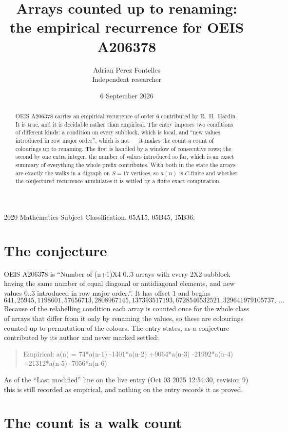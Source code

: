 \documentclass[11pt,a4paper]{article}
\title{Arrays counted up to renaming: the empirical recurrence for OEIS A206378}
\author{Adrian Perez Fontelles\\ \small Independent researcher}
\date{6 September 2026}
\theoremstyle{plain}
\theoremstyle{definition}
\begin{document}
\maketitle

\begin{abstract}
OEIS A206378 carries an empirical recurrence of order $6$ contributed by R.~H.~Hardin. It is
true, and it is decidable rather than empirical. The entry imposes two conditions of different
kinds: a condition on every subblock, which is local, and ``new values introduced in row major
order'', which is not --- it makes the count a count of colourings up to renaming. The first is
handled by a window of consecutive rows; the second by one extra integer, the number of values
introduced so far, which is an exact summary of everything the whole prefix contributes. With
both in the state the arrays are exactly the walks in a digraph on $S=17$ vertices, so $a(n)$
is $C$-finite and whether the conjectured recurrence annihilates it is settled by a finite
exact computation.
\end{abstract}

\noindent\small 2020 Mathematics Subject Classification. 05A15, 05B45, 15B36.\normalsize

\section{The conjecture}

OEIS A206378 is ``Number of (n+1)X4 0..3 arrays with every 2X2 subblock having the same number of equal diagonal or antidiagonal elements, and new values 0..3 introduced in row major order.''. It has offset $1$ and begins
\[
641, 25945, 1198601, 57656713, 2808967145, 137393517193, 6728546532521, 329641979105737,\ \dots
\]
Because of the relabelling condition each array is counted once for the whole class of arrays that differ from it only by renaming the values, so these are colourings counted up to permutation of the colours.
The entry states, as a conjecture contributed by its author and never marked settled:
\begin{quote}
Empirical: a(n) = 74*a(n-1) -1401*a(n-2) +9064*a(n-3) -21992*a(n-4) +21312*a(n-5) -7056*a(n-6)
\end{quote}
As of the ``Last modified'' line on the live entry (Oct 03 2025 12:54:30, revision 9) this is still
recorded as empirical, and nothing on the entry records it as proved.

\section{The count is a walk count}
\end{document}
